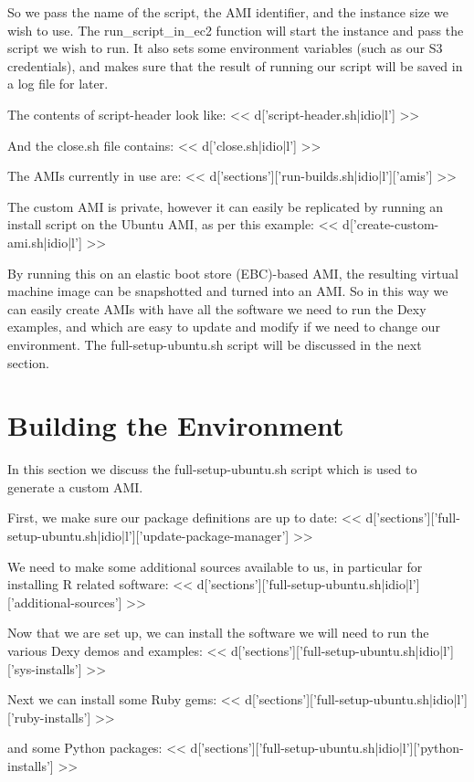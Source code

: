 \documentclass{tufte-handout}
\begin{document}
So we pass the name of the script, the AMI identifier, and the instance size we wish to use. The run\_script\_in\_ec2 function will start the instance and pass the script we wish to run. It also sets some environment variables (such as our S3 credentials), and makes sure that the result of running our script will be saved in a log file for later.

The contents of script-header look like:
<< d['script-header.sh|idio|l'] >>

And the close.sh file contains:
<< d['close.sh|idio|l'] >>

The AMIs currently in use are:
<< d['sections']['run-builds.sh|idio|l']['amis'] >>

The custom AMI is private, however it can easily be replicated by running an install script on the Ubuntu AMI, as per this example:
<< d['create-custom-ami.sh|idio|l'] >>

By running this on an elastic boot store (EBC)-based AMI, the resulting virtual machine image can be snapshotted and turned into an AMI. So in this way we can easily create AMIs with have all the software we need to run the Dexy examples, and which are easy to update and modify if we need to change our environment. The full-setup-ubuntu.sh script will be discussed in the next section.

\section{Building the Environment}

In this section we discuss the full-setup-ubuntu.sh script which is used to generate a custom AMI.

First, we make sure our package definitions are up to date:
<< d['sections']['full-setup-ubuntu.sh|idio|l']['update-package-manager'] >>

We need to make some additional sources available to us, in particular for installing R related software:
<< d['sections']['full-setup-ubuntu.sh|idio|l']['additional-sources'] >>

Now that we are set up, we can install the software we will need to run the various Dexy demos and examples:
<< d['sections']['full-setup-ubuntu.sh|idio|l']['sys-installs'] >>

Next we can install some Ruby gems:
<< d['sections']['full-setup-ubuntu.sh|idio|l']['ruby-installs'] >>

and some Python packages:
<< d['sections']['full-setup-ubuntu.sh|idio|l']['python-installs'] >>
\end{document}
